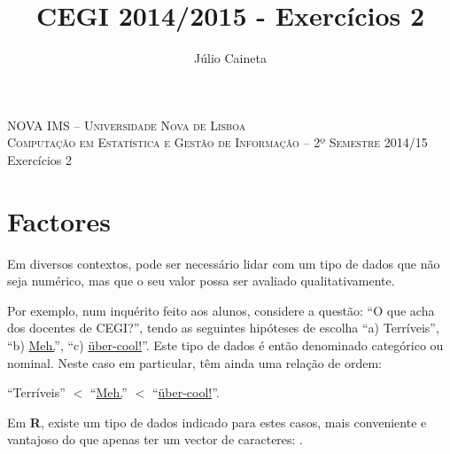 \documentclass{exam}
\author{Júlio Caineta}
\title{CEGI 2014/2015 - Exercícios 2}
\begin{document}
 
\begin{center}
	\textsc {\small NOVA IMS -- Universidade Nova de Lisboa} \\
	\textsc {Computação em Estatística e Gestão de Informação -- 2º Semestre 2014/15}
	\vspace{5mm} \\
	{\large Exercícios 2}
\end{center}
 
\vspace{5mm}

\section{Factores}

Em diversos contextos, pode ser necessário lidar com um tipo de dados que não seja numérico, mas que o seu valor possa ser avaliado qualitativamente.

Por exemplo, num inquérito feito aos alunos, considere a questão: ``O que acha dos docentes de CEGI?'', tendo as seguintes hipóteses de escolha ``a) Terríveis'', ``b) \href{http://www.urbandictionary.com/define.php?term=Meh}{Meh.}'', ``c) \href{http://www.urbandictionary.com/define.php?term=uber-cool}{über-cool!}''. Este tipo de dados é então denominado categórico ou nominal.
Neste caso em particular, têm ainda uma relação de ordem: 

\begin{center}
	``Terríveis'' $<$ ``\href{http://www.urbandictionary.com/define.php?term=Meh}{Meh.}'' $<$ ``\href{http://www.urbandictionary.com/define.php?term=uber-cool}{über-cool!}''.
\end{center}

Em \textbf{R}, existe um tipo de dados indicado para estes casos, mais conveniente e vantajoso do que apenas ter um vector de caracteres: .
 
\end{document}
